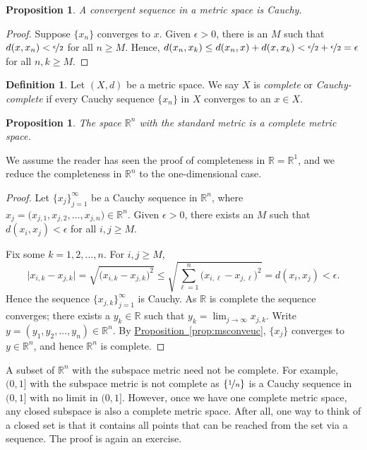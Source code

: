 \documentclass[12pt,openany]{book}
\newcommand{\R}{{\mathbb{R}}}
\newcommand{\myindex}[1]{#1\index{#1}}
\theoremstyle{plain}
\newtheorem{prop}[thm]{Proposition}
\theoremstyle{remark}
\theoremstyle{definition}
\newtheorem{defn}[thm]{Definition}
\theoremstyle{exercise}
\theoremstyle{example}
\newcommand{\propref}[1]{\hyperref[#1]{Proposition~\ref*{#1}}}
\begin{document}
\begin{prop}
A convergent sequence in a metric space is Cauchy.
\end{prop}

\begin{proof}
Suppose $\{ x_n \}$ converges to $x$.
Given $\epsilon > 0$, there is an $M$ such that
$d(x,x_n) < \nicefrac{\epsilon}{2}$ for all $n \geq M$.
Hence,
$d(x_n,x_k) \leq d(x_n,x) + d(x,x_k) < \nicefrac{\epsilon}{2} +
\nicefrac{\epsilon}{2} = \epsilon$
for all $n,k \geq M$.
\end{proof}

\begin{defn}
Let $(X,d)$ be a metric space.  We say $X$ is
\emph{\myindex{complete}} or \emph{\myindex{Cauchy-complete}}
if every Cauchy sequence $\{ x_n \}$ in $X$
converges to an $x \in X$.
\end{defn}

\begin{prop}
The space $\R^n$ with the standard metric is a complete metric space.
\end{prop}

We assume the reader has seen the proof of completeness in $\R = \R^1$,
and we reduce the completeness in $\R^n$ to the one-dimensional case.

\begin{proof}
Let $\{ x_j \}_{j=1}^\infty$ be a Cauchy sequence
in $\R^n$, where $x_j = \bigl(x_{j,1},x_{j,2},\ldots,x_{j,n}\bigr) \in \R^n$.
Given $\epsilon > 0$, there exists an $M$ such that
$d(x_i,x_j) < \epsilon$
for all
$i,j \geq M$.

Fix some $k=1,2,\ldots,n$.  For $i,j \geq M$,
\begin{equation*}
\bigl\lvert x_{i,k} - x_{j,k} \bigr\rvert
=
\sqrt{{\bigl(x_{i,k} - x_{j,k}\bigr)}^2}
\leq
\sqrt{\sum_{\ell=1}^n {\bigl(x_{i,\ell}-x_{j,\ell}\bigr)}^2}
= d(x_i,x_j) < \epsilon .
\end{equation*}
Hence the sequence $\{ x_{j,k} \}_{j=1}^\infty$ is Cauchy.  As $\R$ is
complete the sequence converges; there exists a $y_k \in \R$ such that
$y_k = \lim_{j\to\infty} x_{j,k}$.
Write $y = (y_1,y_2,\ldots,y_n) \in \R^n$.
By \propref{prop:msconveuc}, $\{ x_j \}$ converges
to $y \in \R^n$, and hence $\R^n$ is complete.
\end{proof}

A subset of $\R^n$ with the subspace metric need not be
complete.  For example, $(0,1]$ with the subspace metric is not
complete as $\{ \nicefrac{1}{n} \}$ is a Cauchy sequence in $(0,1]$
with no limit in $(0,1]$.
However,
once we have one complete metric space, any closed subspace is
also a complete metric space.  After all, one way
to think of a closed set is that it contains all points
that can be reached from the set via a sequence.
The proof is again an exercise.
\end{document}
